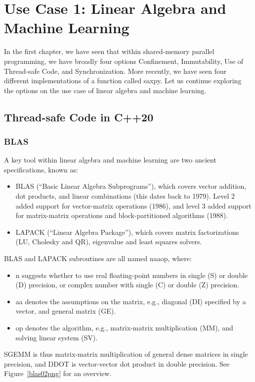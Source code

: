 \chapter{Use Case 1: Linear Algebra and Machine Learning}
\label{sec:lingebra}

In the first chapter, we have seen that within 
shared-memory parallel programming, we have broadly 
four options Confinement, Immutability, 
Use of Thread-safe Code, and Synchronization. 
More recently, we have seen four different  
implementations of a function called saxpy.
Let us continue exploring the options on the use 
case of linear algebra and machine learning. 

\section{Thread-safe Code in C++20}

\subsection{BLAS}

A key tool within linear algebra and machine learning are 
two ancient specifications, known as:
\begin{itemize} 
\item BLAS (``Basic Linear Algebra Subprograms''),
which covers vector addition, dot products, and linear combinations (this dates back to 1979).
 Level 2 added support for vector-matrix operations (1986),
 and level 3 added support for matrix-matrix operations and 
 block-partitioned algorithms (1988).
\item LAPACK (``Linear Algebra Package''), which 
covers matrix factorizations (LU, Cholesky and QR),
 eigenvalue and least squares solvers.
\end{itemize}

BLAS and LAPACK subroutines are all named naaop, where:
\begin{itemize} 
    \item n suggests whether to use real floating-point numbers in 
     single (S) or double (D) precision, 
     or complex number with single (C)
     or double (Z) precision.
    \item aa denotes the assumptions on the matrix, e.g., 
    diagonal (DI) specified by a vector, and 
    general matrix (GE).
    \item op denotes the algorithm, e.g., 
    matrix-matrix multiplication (MM), and 
    solving linear system (SV).
\end{itemize}
SGEMM is thus matrix-matrix multiplication of general dense matrices in single precision,
and DDOT is vector-vector dot product in double precision.
See Figure~\ref{blas02png} for an overview. 

